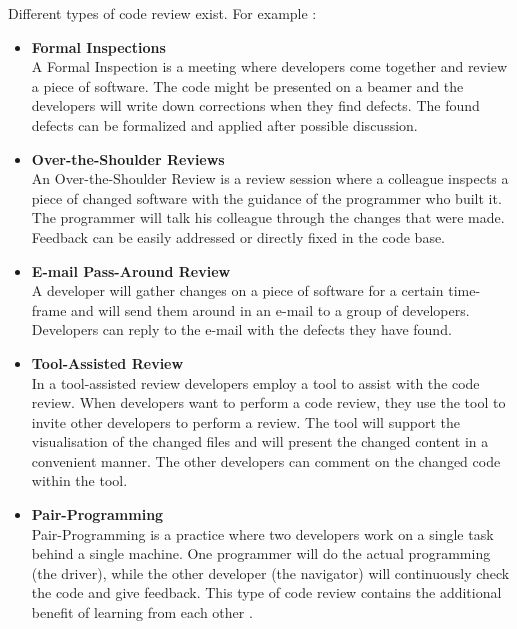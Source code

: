 Different types of code review exist. For example \autocite[23--38]{cohen2006best}:
\begin{itemize}
\setlength\itemsep{0em}
\item \textbf{Formal Inspections} \autocite[23]{cohen2006best}\\
A Formal Inspection is a meeting where developers come together and review a piece of software.
The code might be presented on a beamer and the developers will write down corrections when they find defects.
The found defects can be formalized and applied after possible discussion.
\item \textbf{Over-the-Shoulder Reviews} \autocite[26]{cohen2006best}\\
An Over-the-Shoulder Review is a review session where a colleague inspects a piece of changed software with the guidance of the programmer who built it.
The programmer will talk his colleague through the changes that were made.
Feedback can be easily addressed or directly fixed in the code base.
\item \textbf{E-mail Pass-Around Review} \autocite[30]{cohen2006best}\\
A developer will gather changes on a piece of software for a certain time-frame and will send them around in an e-mail to a group of developers.
Developers can reply to the e-mail with the defects they have found.
\item \textbf{Tool-Assisted Review} \autocite[34]{cohen2006best}\\
In a tool-assisted review developers employ a tool to assist with the code review.
When developers want to perform a code review, they use the tool to invite other developers to perform a review.
The tool will support the visualisation of the changed files and will present the changed content in a convenient manner.
The other developers can comment on the changed code within the tool.
\item \textbf{Pair-Programming} \autocite[37]{cohen2006best}\\
Pair-Programming is a practice where two developers work on a single task behind a single machine.
One programmer will do the actual programming (the driver), while the other developer (the navigator) will continuously check the code and give feedback.
This type of code review contains the additional benefit of learning from each other \autocite{cockburn2000costs}.
\end{itemize}

